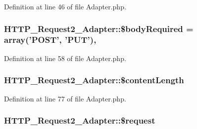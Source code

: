 Definition at line 46 of file Adapter.\-php.

\hypertarget{classHTTP__Request2__Adapter_a1c84e4f08fed2fdd4511ea12bf479595}{
\subsubsection[{\$body\-Required}]{\setlength{\rightskip}{0pt plus 5cm}H\-T\-T\-P\-\_\-\-Request2\-\_\-\-Adapter\-::\$body\-Required = array('P\-O\-S\-T', 'P\-U\-T')\hspace{0.3cm}{\ttfamily [static]}, {\ttfamily [protected]}}}\label{classHTTP__Request2__Adapter_a1c84e4f08fed2fdd4511ea12bf479595}


Definition at line 58 of file Adapter.\-php.

\hypertarget{classHTTP__Request2__Adapter_ac8dc7108f1d54ec9b94224f57577cc3e}{
\subsubsection[{\$content\-Length}]{\setlength{\rightskip}{0pt plus 5cm}H\-T\-T\-P\-\_\-\-Request2\-\_\-\-Adapter\-::\$content\-Length\hspace{0.3cm}{\ttfamily [protected]}}}\label{classHTTP__Request2__Adapter_ac8dc7108f1d54ec9b94224f57577cc3e}


Definition at line 77 of file Adapter.\-php.

\hypertarget{classHTTP__Request2__Adapter_ad7df680c105146f9fdd4b386220be914}{
\subsubsection[{\$request}]{\setlength{\rightskip}{0pt plus 5cm}H\-T\-T\-P\-\_\-\-Request2\-\_\-\-Adapter\-::\$request\hspace{0.3cm}{\ttfamily [protected]}}}\label{classHTTP__Request2__Adapter_ad7df680c105146f9fdd4b386220be914}



